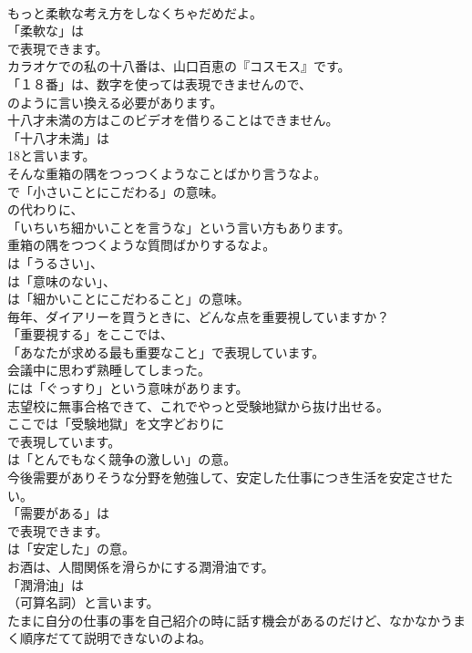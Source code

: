 \documentclass[8pt]{extreport}
\begin{document}
\begin{CJK}{UTF8}{min}
\\	もっと柔軟な考え方をしなくちゃだめだよ。 
\\	「柔軟な」は 
\\	で表現できます。	
\\	カラオケでの私の十八番は、山口百恵の『コスモス』です。 
\\	「１８番」は、数字を使っては表現できませんので、
\\	のように言い換える必要があります。	
\\	十八才未満の方はこのビデオを借りることはできません。 
\\	「十八才未満」は
\\	18と言います。	
\\	そんな重箱の隅をつっつくようなことばかり言うなよ。 
\\	で「小さいことにこだわる」の意味。
\\	の代わりに、
\\	「いちいち細かいことを言うな」という言い方もあります。	
\\	重箱の隅をつつくような質問ばかりするなよ。 
\\	は「うるさい」、
\\	は「意味のない」、
\\	は「細かいことにこだわること」の意味。	
\\	毎年、ダイアリーを買うときに、どんな点を重要視していますか？ 
\\	「重要視する」をここでは、
\\	「あなたが求める最も重要なこと」で表現しています。	
\\	会議中に思わず熟睡してしまった。 
\\	には「ぐっすり」という意味があります。	
\\	志望校に無事合格できて、これでやっと受験地獄から抜け出せる。 
\\	ここでは「受験地獄」を文字どおりに 
\\	で表現しています。
\\	は「とんでもなく競争の激しい」の意。	
\\	今後需要がありそうな分野を勉強して、安定した仕事につき生活を安定させたい。 
\\	「需要がある」は 
\\	で表現できます。
\\	は「安定した」の意。	
\\	お酒は、人間関係を滑らかにする潤滑油です。 
\\	「潤滑油」は
\\	（可算名詞）と言います。	
\\	たまに自分の仕事の事を自己紹介の時に話す機会があるのだけど、なかなかうまく順序だてて説明できないのよね。 

\end{CJK}
\end{document}

